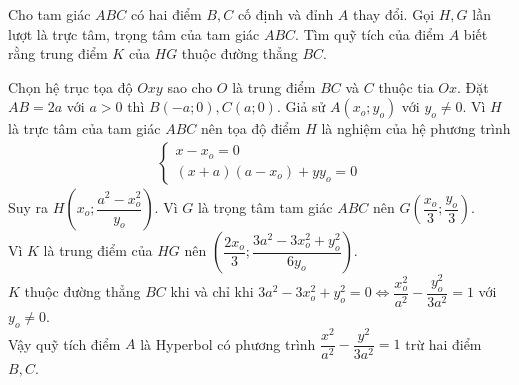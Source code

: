 \begin{bt}[VMO 2006-2007]%
	Cho tam giác $ABC$ có hai điểm $B,C$ cố định và đỉnh $A$ thay đổi. Gọi $H, G$ lần lượt là trực tâm, trọng tâm của tam giác $ABC$. Tìm quỹ tích của điểm $A$ biết rằng trung điểm $K$ của $HG$ thuộc đường thẳng $BC$.
	\loigiai
	{
		\vspace{4cm}
		\begin{center}
		\end{center}
		\vspace{1.5cm}
		Chọn hệ trục tọa độ $Oxy$ sao cho $O$ là trung điểm $BC$ và $C$ thuộc tia $Ox$. Đặt $AB=2a$ với $a>0$ thì $B(-a;0), C(a;0)$. Giả sử $A(x_o;y_o)$ với $y_o\neq 0$. Vì $H$ là trực tâm của tam giác $ABC$ nên tọa độ điểm $H$ là nghiệm của hệ phương trình 
		\begin{align*}
		\left\lbrace \begin{array}{l}
		x-x_o=0 \\
		(x+a)(a-x_o)+yy_o=0
		\end{array} \right.
		\end{align*}
		Suy ra $H\left(x_o;\dfrac{a^2-x^2_o}{y_o}\right)$.
		Vì $G$ là trọng tâm tam giác $ABC$ nên $G\left(\dfrac{x_o}{3};\dfrac{y_o}{3}\right)$.\\
		Vì $K$ là trung điểm của $HG$ nên $\left(\dfrac{2x_o}{3};\dfrac{3a^2-3x^2_o+y^2_o}{6y_o}\right)$.\\
		$K$ thuộc đường thẳng $BC$ khi và chỉ khi $3a^2-3x^2_o+y^2_o=0\Leftrightarrow \dfrac{x^2_o}{a^2}-\dfrac{y^2_o}{3a^2}=1$ với $y_o\neq 0$.\\
		Vậy quỹ tích điểm $A$ là Hyperbol có phương trình  $\dfrac{x^2}{a^2}-\dfrac{y^2}{3a^2}=1$ trừ hai điểm $B, C$.
	}
\end{bt}
